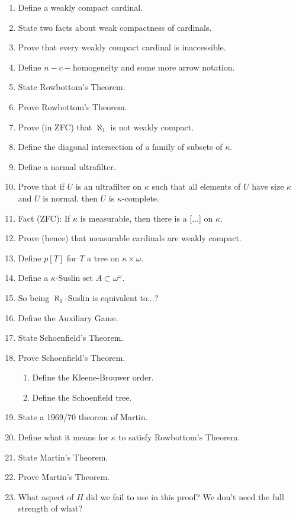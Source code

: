 \documentclass[]{article}
\newcommand{\om}{\omega}
\begin{document}
\begin{enumerate}
    \item Define a weakly compact cardinal.
    \item State two facts about weak compactness of cardinals.
    \item Prove that every weakly compact cardinal is inaccessible.
    \item Define $n-c-$homogeneity and some more arrow notation.
    \item State Rowbottom's Theorem.
    \item Prove Rowbottom's Theorem.
    \item Prove (in ZFC) that $\aleph_1$ is not weakly compact.
    \item Define the diagonal intersection of a family of subsets of $\kappa$.
    \item Define a normal ultrafilter.
    \item Prove that if $U$ is an ultrafilter on $\kappa$ such that all elements of $U$ have size $\kappa$ and $U$ is normal, then $U$ is $\kappa$-complete.
    \item Fact (ZFC): If $\kappa$ is measurable, then there is a [...] on $\kappa$.
    \item Prove (hence) that measurable cardinals are weakly compact.
    \item Define $p[T]$ for $T$ a tree on $\kappa\times\om$.
    \item Define a $\kappa$-Suslin set $A\subset\om^\om$.
    \item So being $\aleph_0$-Suslin is equivalent to...?
    \item Define the Auxiliary Game.
    \item State Schoenfield's Theorem.
    \item Prove Schoenfield's Theorem.
    \begin{enumerate}
        \item Define the Kleene-Brouwer order.
        \item Define the Schoenfield tree.
    \end{enumerate}
    \item State a 1969/70 theorem of Martin.
    \item Define what it means for $\kappa$ to satisfy Rowbottom's Theorem.
    \item State Martin's Theorem.
    \item Prove Martin's Theorem.
    \item What aspect of $H$ did we fail to use in this proof? We don't need the full strength of what?

\end{enumerate}
\end{document}

